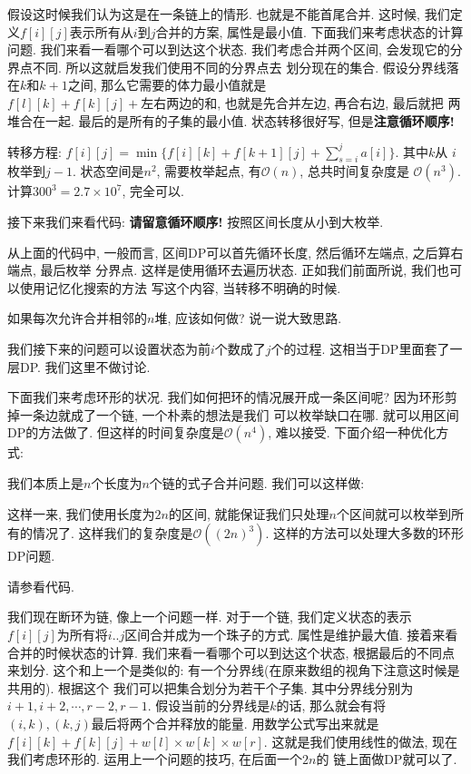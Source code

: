  假设这时候我们认为这是在一条链上的情形. 也就是不能首尾合并.
这时候, 我们定义$f[i][j]$表示所有从$i$到$j$合并的方案, 
属性是最小值. 下面我们来考虑状态的计算问题. 我们来看一看哪个可以到达这个状态. 
我们考虑合并两个区间, 会发现它的分界点不同. 所以这就启发我们使用不同的分界点去
划分现在的集合. 假设分界线落在$k$和$k+1$之间, 那么它需要的体力最小值就是
$f[l][k]+f[k][j]+\text{左右两边的和}$, 也就是先合并左边, 再合右边, 最后就把
两堆合在一起.  最后的是所有的子集的最小值. 状态转移很好写, 但是\textbf{注意循环顺序!}

转移方程: $f[i][j] = \min\{f[i][k]+f[k+1][j]+\sum_{s=i}^j a[i]\}$. 其中$k$从
$i$枚举到$j-1$. 状态空间是$n^2$, 需要枚举起点, 有$\mathcal O(n)$, 总共时间复杂度是
$\mathcal O(n^3)$. 计算$300^3=2.7\times 10^7$, 完全可以. 

接下来我们来看代码: \textbf{请留意循环顺序! } 按照区间长度从小到大枚举. 

从上面的代码中, 一般而言, 区间DP可以首先循环长度, 然后循环左端点, 之后算右端点, 最后枚举
分界点. 这样是使用循环去遍历状态. 正如我们前面所说, 我们也可以使用记忆化搜索的方法
写这个内容, 当转移不明确的时候. 

\begin{ques}
    如果每次允许合并相邻的$n$堆, 应该如何做? 说一说大致思路. 
\end{ques}

我们接下来的问题可以设置状态为前$i$个数成了$j$个的过程. 这相当于DP里面套了一层DP. 
我们这里不做讨论. 

 下面我们来考虑环形的状况. 我们如何把环的情况展开成一条区间呢? 
因为环形剪掉一条边就成了一个链, 一个朴素的想法是我们
可以枚举缺口在哪. 就可以用区间DP的方法做了. 但这样的时间复杂度是$\mathcal O(n^4)$,
难以接受. 下面介绍一种优化方式: 

我们本质上是$n$个长度为$n$个链的式子合并问题. 我们可以这样做: 


这样一来, 我们使用长度为$2n$的区间, 就能保证我们只处理$n$个区间就可以枚举到所有的情况了. 
这样我们的复杂度是$\mathcal O((2n)^3)$. 这样的方法可以处理大多数的环形DP问题. 

请参看代码. 

 我们现在断环为链, 像上一个问题一样. 对于一个链, 我们定义状态的表示
$f[i][j]$为所有将$i..j$区间合并成为一个珠子的方式. 属性是维护最大值. 接着来看
合并的时候状态的计算. 我们来看一看哪个可以到达这个状态, 根据最后的不同点来划分. 
这个和上一个是类似的: 有一个分界线(在原来数组的视角下注意这时候是共用的). 根据这个
我们可以把集合划分为若干个子集. 其中分界线分别为$i+1, i+2, \cdots, r-2, r-1$.
假设当前的分界线是$k$的话, 那么就会有将$(i, k), (k, j)$最后将两个合并释放的能量. 
用数学公式写出来就是$f[i][k] + f[k][j] + w[l]\times w[k]\times w[r]$. 
这就是我们使用线性的做法, 现在我们考虑环形的. 运用上一个问题的技巧, 在后面一个$2n$的
链上面做DP就可以了. 

